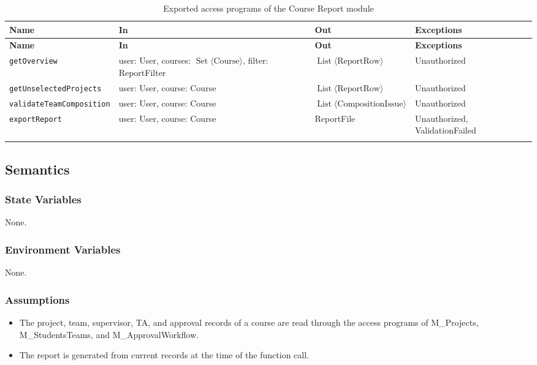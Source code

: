 \documentclass[12pt, titlepage]{article}
\begin{document}
\begingroup
\small
\setlength{\tabcolsep}{4pt}
\renewcommand{\arraystretch}{1.2}
\begin{longtable}{>{\raggedright\arraybackslash}p{}
        >{\raggedright\arraybackslash}p{}
        >{\raggedright\arraybackslash}p{}
        >{\raggedright\arraybackslash}p{}}
    \toprule
    \textbf{Name} & \textbf{In} & \textbf{Out} & \textbf{Exceptions} \\
    \midrule
    \endfirsthead
    \toprule
    \textbf{Name} & \textbf{In} & \textbf{Out} & \textbf{Exceptions} \\
    \midrule
    \endhead
    \endfoot
    \texttt{getOverview} & user: User, courses: $\operatorname{Set}\langle\text{Course}\rangle$, filter: ReportFilter & $\operatorname{List}\langle\text{ReportRow}\rangle$ & Unauthorized \\
    \texttt{getUnselectedProjects} & user: User, course: Course & $\operatorname{List}\langle\text{ReportRow}\rangle$ & Unauthorized \\
    \texttt{validateTeamComposition} & user: User, course: Course & $\operatorname{List}\langle\text{CompositionIssue}\rangle$ & Unauthorized \\
    \texttt{exportReport} & user: User, course: Course & ReportFile & Unauthorized, ValidationFailed \\
    \bottomrule
    \caption{Exported access programs of the Course Report module}
    \label{TblCourseReportAccessPrograms}
\end{longtable}
\endgroup

\subsection{Semantics}

\subsubsection{State Variables}
None.

\subsubsection{Environment Variables}
None.

\subsubsection{Assumptions}

\begin{itemize}
    \item The project, team, supervisor, TA, and approval records of a course are read through
    the access programs of M\_Projects, M\_StudentsTeams, and M\_ApprovalWorkflow.
    \item The report is generated from current records at the time of the function call.
\end{itemize}
\end{document}
